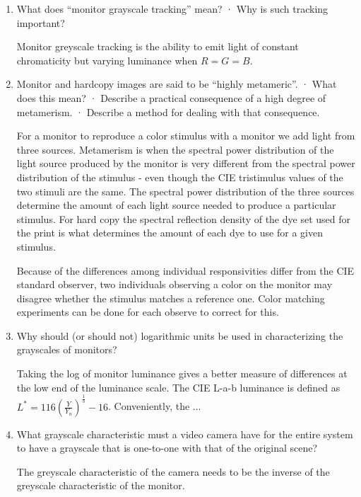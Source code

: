 \documentclass{amsart}
\theoremstyle{definition}
\theoremstyle{remark}
\numberwithin{equation}{section}
\begin{document}
\begin{enumerate}
\item What does “monitor grayscale tracking” mean?
 · Why is such tracking important?
 \par Monitor greyscale tracking is the ability to emit light of
 constant chromaticity but varying luminance when $R=G=B$.

\item Monitor and hardcopy images are said to be “highly
metameric”.
 · What does this mean?
 · Describe a practical consequence of a high degree of metamerism.
 · Describe a method for dealing with that consequence.
\par For a monitor to reproduce a color stimulus with a monitor we add light
from three sources.    Metamerism is when the spectral power
distribution of the light source produced by the monitor is very
different from the spectral power distribution of the stimulus -
even though the CIE tristimulus values of the two stimuli are the
same.  The spectral power distribution of the three sources
determine the amount of each light source needed to produce a
particular stimulus.  For hard copy the spectral reflection
density of the dye set used for the print is what determines the
amount of each dye to use for a given stimulus.

Because of the differences among individual responsivities differ
from the CIE standard observer, two individuals observing a color
on the monitor may disagree whether the stimulus matches a
reference one.  Color matching experiments can be done for each
observe to correct for this.

\item Why should (or should not) logarithmic units be used in
characterizing the grayscales of monitors?

\par Taking the log of monitor luminance gives a better measure of differences at the low end of the luminance scale.
The CIE L-a-b luminance is defined as  $L^{*}=116
(\frac{Y}{Y_n})^{\frac{1}{3}} -16 $.  Conveniently, the ...


\item What grayscale characteristic must a video camera have for
the entire system to have a grayscale that is one-to-one with that
of the original scene?

\par The greyscale characteristic of the camera needs to be the inverse
of the greyscale characteristic of the monitor.


\end{enumerate}
\end{document}
